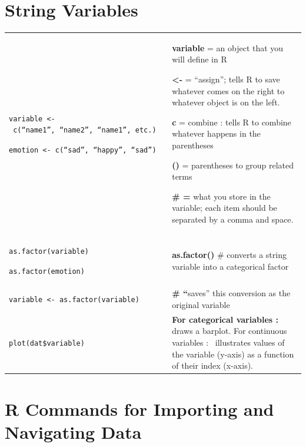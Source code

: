\documentclass[
  letterpaper,
  DIV=11,
  numbers=noendperiod,
  oneside]{scrreprt}
\begin{document}
\section{String Variables}\label{string-variables}

\begin{longtable}[]{@{}
  >{\raggedright\arraybackslash}p{}
  >{\raggedright\arraybackslash}p{}@{}}
\toprule\noalign{}
\endhead
\bottomrule\noalign{}
\endlastfoot
\texttt{variable\ \textless{}-\ c(“name1”,\ “name2”,\ “name1”,\ etc.)}

\texttt{emotion\ \textless{}-\ c(“sad”,\ “happy”,\ “sad”)} &
\textbf{variable} = an object that you will define in R

\textbf{\textless-} = ``assign''; tells R to save whatever comes on the
right to whatever object is on the left.

\textbf{c} = combine : tells R to combine whatever happens in the
parentheses

\textbf{()} = parentheses to group related terms

\textbf{\# =} what you store in the variable; each item should be
separated by a comma and space. \\
\texttt{as.factor(variable)}

\texttt{as.factor(emotion)} & \textbf{as.factor()} \# converts a string
variable into a categorical factor \\
\texttt{variable\ \textless{}-\ as.factor(variable)} & \textbf{\#
``}saves'' this conversion as the original variable \\
\texttt{plot(dat\$variable)} & \textbf{For categorical variables :}
draws a barplot. For continuous variables :~ illustrates values of the
variable (y-axis) as a function of their index (x-axis). \\
\end{longtable}

\section{R Commands for Importing and Navigating
Data}\label{r-commands-for-importing-and-navigating-data}
\end{document}
